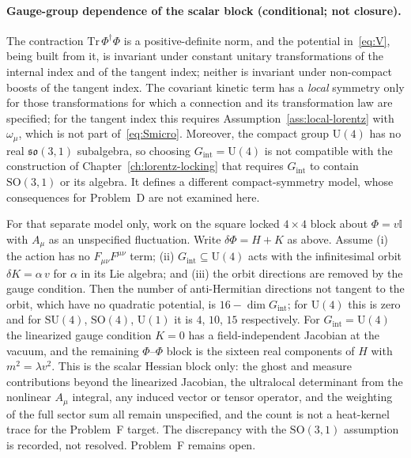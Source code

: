 \paragraph{Gauge-group dependence of the scalar block (conditional; not closure).}
The contraction \(\mathrm{Tr}\,\Phi^\dagger\Phi\) is a positive-definite norm,
and the potential in~\eqref{eq:V}, being built from it, is invariant under
constant unitary transformations of the internal index and of the tangent
index; neither is invariant under non-compact boosts of the tangent index.
The covariant kinetic term has a
\emph{local} symmetry only for those transformations for which a connection and
its transformation law are specified; for the tangent index this requires
Assumption~\ref{ass:local-lorentz} with \(\omega_\mu\), which is not part
of~\eqref{eq:Smicro}. Moreover, the compact group \(\mathrm{U}(4)\) has no
real \(\mathfrak{so}(3,1)\) subalgebra, so choosing
\(G_{\mathrm{int}}=\mathrm{U}(4)\) is not compatible with the construction of
Chapter~\ref{ch:lorentz-locking} that requires \(G_{\mathrm{int}}\) to contain
\(\mathrm{SO}(3,1)\) or its algebra. It defines a different compact-symmetry
model, whose consequences for Problem~D are not examined here.

For that separate model only, work on the square locked \(4\times4\) block
about \(\Phi=v\mathbb{I}\) with \(A_\mu\) as an unspecified fluctuation. Write
\(\delta\Phi=H+K\) as above. Assume (i) the action has no
\(F_{\mu\nu}F^{\mu\nu}\) term; (ii) \(G_{\mathrm{int}}\subseteq\mathrm{U}(4)\)
acts with the infinitesimal orbit \(\delta K=\alpha\,v\) for \(\alpha\) in its
Lie algebra; and (iii) the orbit directions are removed by the gauge
condition. Then the number of anti-Hermitian directions not tangent to the
orbit, which have no quadratic potential, is \(16-\dim G_{\mathrm{int}}\); for
\(\mathrm{U}(4)\) this is zero and for \(\mathrm{SU}(4)\), \(\mathrm{SO}(4)\),
\(\mathrm{U}(1)\) it is \(4\), \(10\), \(15\) respectively. For
\(G_{\mathrm{int}}=\mathrm{U}(4)\) the linearized gauge condition \(K=0\) has a
field-independent Jacobian at the vacuum, and the remaining
\(\Phi\)--\(\Phi\) block is the sixteen real components of \(H\) with
\(m^2=\lambda v^2\). This is the scalar Hessian block only: the ghost and
measure contributions beyond the linearized Jacobian, the ultralocal
determinant from the nonlinear \(A_\mu\) integral, any induced vector or tensor
operator, and the weighting of the full sector sum all remain unspecified, and
the count is not a heat-kernel trace for the Problem~F target. The
discrepancy with the \(\mathrm{SO}(3,1)\) assumption is recorded, not resolved.
Problem~F remains open.

